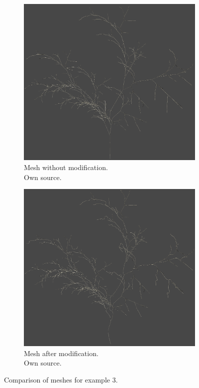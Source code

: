 \documentclass[b5paper,twoside,11pt]{article}
\begin{document}
\begin{figure}[!htp]
\centering
\begin{subfigure}{.49\textwidth}
  \centering
  \includegraphics[width=0.8\linewidth]{przyklad3MOD}
\caption{Mesh without modification.\\Own source. \label{przyklad3.siatka}}
\end{subfigure}
%
\begin{subfigure}{.49\textwidth}
  \centering
  \includegraphics[width=0.8\linewidth]{przyklad3}
\caption{Mesh after modification.\\Own source. \label{przyklad3.siatkaMOD}}
\end{subfigure}
\caption{Comparison of meshes for example  3.}
\label{przyklad3}
\end{figure}
\newpage
\end{document}
